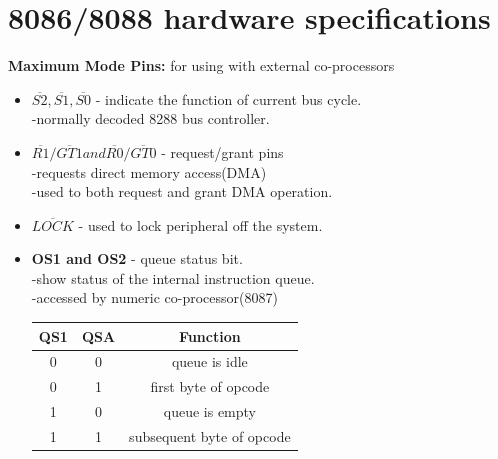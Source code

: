 \documentclass[12pt]{article}
\begin{document}
\section{8086/8088 hardware specifications}
\textbf{Maximum Mode Pins:} for using with external co-processors \\
\begin{itemize}
	\item$\overline{S2}, \overline{S1}, \overline{S0}$ - indicate the function of current bus cycle.\\
	-normally decoded 8288 bus controller.
	
	\item $\overline{R1}/\overline{GT1} and \overline{R0}/\overline{GT0}$ - request/grant pins \\
	-requests direct memory access(DMA)\\
	-used to both request and grant DMA operation.
	
	\item\textbf{$\overline{LOCK}$} - used to lock peripheral off the system.
	
	\item \textbf{OS1 and OS2} - queue status bit.\\
	-show status of the internal instruction queue.\\
	-accessed by numeric co-processor(8087)
	
	\begin{table}[H]
		\centering
		\begin{tabular}{|c|c|c|}
			\hline
			QS1 & QSA & Function\\\hline
			0 & 0 & queue is idle\\\hline
			0 & 1 & first byte of opcode\\\hline
			1 & 0 & queue is empty\\\hline
			1 & 1 & subsequent byte of opcode\\\hline
		\end{tabular}
	\end{table} 
\end{itemize}
\end{document}
